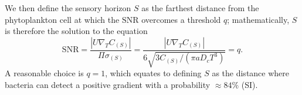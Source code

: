 \documentclass[9pt,twocolumn,twoside]{pnas-new}
\newcommand{\SNR}{\mathrm{SNR}}
\begin{document}
We then define the sensory horizon $S$ as the farthest distance from the phytoplankton cell at which the $\SNR$ overcomes a threshold $q$; mathematically, $S$ is therefore the solution to the equation
\begin{equation}
    \SNR = \dfrac{|U\nabla_T C_{(S)}|}{\Pi\sigma_{(S)}} =
    \dfrac{|U\nabla_T C_{(S)}|}{6\sqrt{3C_{(S)}/(\pi a D_c T^3)}} = q.
\end{equation}
A reasonable choice is $q=1$, which equates to defining $S$ as the distance where bacteria can detect a positive gradient with a probability $\approx 84\%$ (SI).
\end{document}
